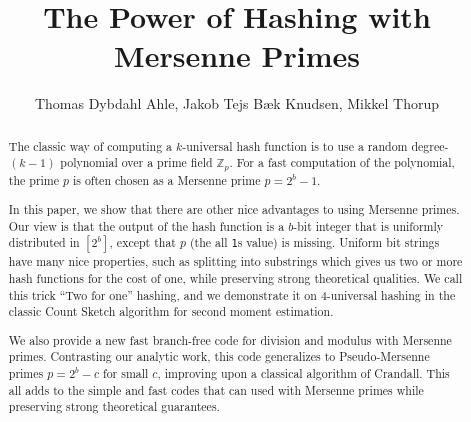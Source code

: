 

\title{The Power of Hashing with Mersenne Primes}
\author{Thomas Dybdahl Ahle, Jakob Tejs B\ae{}k Knudsen, Mikkel Thorup}


\maketitle

\begin{abstract}
The classic way of computing a $k$-universal hash function is to use a random degree-$(k-1)$ polynomial over a prime field $\mathbb Z_p$.
For a fast computation of the polynomial, the prime $p$ is often chosen as a Mersenne prime $p=2^b-1$.

In this paper, we show that there are other nice advantages to using Mersenne primes.
Our view is that the output of the hash function is a $b$-bit integer that is uniformly distributed in $[2^b]$, except that $p$ (the all \texttt1s value) is missing.
Uniform bit strings have many nice properties, such as splitting into substrings which gives us two or more hash functions for the cost of one, while preserving strong theoretical qualities.
We call this trick ``Two for one'' hashing, and we demonstrate it on 4-universal hashing in the classic Count Sketch algorithm for second moment estimation.

We also provide a new fast branch-free code for division and modulus
with Mersenne primes. Contrasting our analytic work, this code
generalizes to Pseudo-Mersenne primes $p=2^b-c$ for small $c$,
improving upon a classical algorithm of Crandall.  This all
adds to the simple and fast codes that can used with Mersenne primes
while preserving strong theoretical guarantees.
\end{abstract}

\tableofcontents







% 











